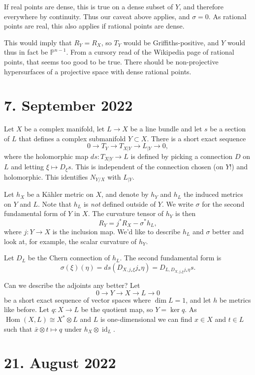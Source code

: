 \documentclass[11pt]{article}
\theoremstyle{definition}
\newcommand{\kk}[1]{\mathbb{#1}}
\DeclareMathOperator{\Hom}{Hom}
\DeclareMathOperator{\id}{id}
\begin{document}
If real points are dense, this is true on a dense subset of $Y$, and therefore
everywhere by continuity.
Thus our caveat above applies, and $\sigma = 0$.
As rational points are real, this also applies if rational points are dense.

This would imply that $R_Y = R_X$, so $T_Y$ would be Griffiths-positive, and $Y$
would thus in fact be $\kk P^{n-1}$.
From a cursory read of the Wikipedia page of rational points, that seems too
good to be true. There should be non-projective hypersurfaces of a projective
space with dense rational points.



\section{7. September 2022}

Let $X$ be a complex manifold, let $L \to X$ be a line bundle and let $s$ be a
section of $L$ that defines a complex submanifold $Y \subset X$. There is a
short exact sequence
$$
0 \to T_Y \to T_{X|Y} \to L_{|Y} \to 0,
$$
where the holomorphic map $ds : T_{X|Y} \to L$ is defined by picking a connection $D$
on $L$ and letting $\xi \mapsto D_\xi s$. This is independent of the connection
chosen (on $Y$!) and holomorphic. This identifies $N_{Y/X}$ with $L_{|Y}$.

Let $h_X$ be a K\"ahler metric on $X$, and denote by $h_Y$ and $h_L$ the induced
metrics on $Y$ and $L$. Note that $h_L$ is \emph{not} defined outside of $Y$.
We write $\sigma$ for the second fundamental form of $Y$
in $X$. The curvature tensor of $h_Y$ is then
\[
R_Y = j^* R_X - \sigma^* h_L,
\]
where $j : Y \to X$ is the inclusion map. We'd like to describe $h_L$ and
$\sigma$ better and look at, for example, the scalar curvature of $h_Y$.

Let $D_L$ be the Chern connection of $h_L$. The second fundamental form is
\[
    \sigma(\xi)(\eta)
    = ds(D_{X,j_*\xi} j_* \eta)
    = D_{L,D_{X,j_*\xi} j_* \eta} s.
\]

Can we describe the adjoints any better? Let
$$
0 \to Y \to X \to L \to 0
$$
be a short exact sequence of vector spaces where $\dim L = 1$, and let $h$ be
metrics like before. Let $q : X \to L$ be the quotient map, so $Y = \ker q$.
As $\Hom(X,L) \cong X^* \otimes L$ and $L$ is one-dimensional we can find $x \in
X$ and $t \in L$ such that $\bar x \otimes t \mapsto q$ under $h_X \otimes
\id_L$.

\section{21. August 2022}
\end{document}
